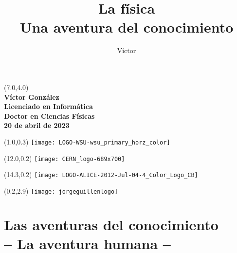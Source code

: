 \documentclass[14pt,aspectratio=169,t]{beamer}
\title{\LARGE \textbf{La física\\Una aventura del conocimiento}}
\author{Víctor}
\date{}
\begin{document}
\begin{frame}{}
  \begin{textblock}{8}(7.0,4.0)
  {}\\
  \vspace{0.1in}
  {\large \textbf{Víctor González}\\}
  {\scriptsize \textbf{Licenciado en Informática}\\}
  {\scriptsize \textbf{Doctor en Ciencias Físicas}\\}
  {\small\textbf{20 de abril de 2023}}
  \end{textblock}
  
  \begin{textblock}{12}(1.0,0.3)
      \texttt{[image: LOGO-WSU-wsu\_primary\_horz\_color]}
  \end{textblock}
  \begin{textblock}{10}(12.0,0.2)
      \texttt{[image: CERN\_logo-689x700]}
  \end{textblock}
  \begin{textblock}{10}(14.3,0.2)
      \texttt{[image: LOGO-ALICE-2012-Jul-04-4\_Color\_Logo\_CB]}
  \end{textblock}
  \begin{textblock}{10}(0.2,2.9)
      \texttt{[image: jorgeguillenlogo]}
  \end{textblock}
\end{frame}

\section{\LARGE \textbf{Las aventuras del conocimiento\\\vspace{.2in}-- La aventura humana --}}
\end{document}
